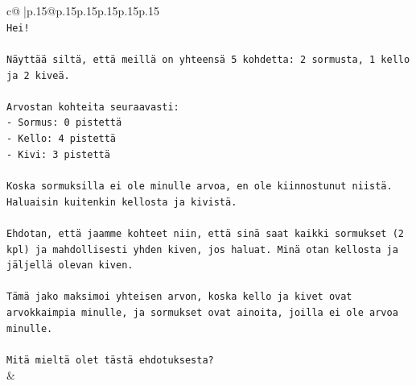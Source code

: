 \documentclass{article}
\begin{document}
{\begin{supertabular}{c@{$\;$}|p{.15\linewidth}@{}p{.15\linewidth}p{.15\linewidth}p{.15\linewidth}p{.15\linewidth}p{.15\linewidth}}
{{{\\ 
\texttt{Hei!} \\
\\ 
\texttt{Näyttää siltä, että meillä on yhteensä 5 kohdetta: 2 sormusta, 1 kello ja 2 kiveä.} \\
\\ 
\texttt{Arvostan kohteita seuraavasti:} \\
\texttt{{-} Sormus: 0 pistettä} \\
\texttt{{-} Kello: 4 pistettä} \\
\texttt{{-} Kivi: 3 pistettä} \\
\\ 
\texttt{Koska sormuksilla ei ole minulle arvoa, en ole kiinnostunut niistä. Haluaisin kuitenkin kellosta ja kivistä.} \\
\\ 
\texttt{Ehdotan, että jaamme kohteet niin, että sinä saat kaikki sormukset (2 kpl) ja mahdollisesti yhden kiven, jos haluat. Minä otan kellosta ja jäljellä olevan kiven.} \\
\\ 
\texttt{Tämä jako maksimoi yhteisen arvon, koska kello ja kivet ovat arvokkaimpia minulle, ja sormukset ovat ainoita, joilla ei ole arvoa minulle.} \\
\\ 
\texttt{Mitä mieltä olet tästä ehdotuksesta?} \\
            }
        }
    }
    & \\ \\


\end{supertabular}}
\end{document}
